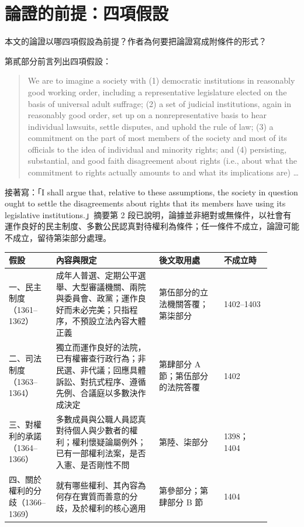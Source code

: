 \chapter{論證的前提：四項假設}


\begin{qaquestion}
本文的論證以哪四項假設為前提？作者為何要把論證寫成附條件的形式？
\end{qaquestion}

第貳部分前言列出四項假設：

\begin{quote}
We are to imagine a society with (1) democratic institutions in reasonably good working order, including a representative legislature elected on the basis of universal adult suffrage; (2) a set of judicial institutions, again in reasonably good order, set up on a nonrepresentative basis to hear individual lawsuits, settle disputes, and uphold the rule of law; (3) a commitment on the part of most members of the society and most of its officials to the idea of individual and minority rights; and (4) persisting, substantial, and good faith disagreement about rights (i.e., about what the commitment to rights actually amounts to and what its implications are) \ldots{}
\end{quote}

接著寫：「I shall argue that, relative to these assumptions, the society in question ought to settle the disagreements about rights that its members have using its legislative institutions.」摘要第 2 段已說明，論據並非絕對或無條件，以社會有運作良好的民主制度、多數公民認真對待權利為條件；任一條件不成立，論證可能不成立，留待第柒部分處理。

\begin{longtable}{@{}L{0.16\linewidth}L{0.35\linewidth}L{0.22\linewidth}L{0.16\linewidth}@{}}
\toprule
假設 & 內容與限定 & 後文取用處 & 不成立時 \\
\midrule
\endhead
一、民主制度（1361--1362） & 成年人普選、定期公平選舉、大型審議機關、兩院與委員會、政黨；運作良好而未必完美；只指程序，不預設立法內容大體正義 & 第伍部分的立法機關答覆；第柒部分 & 1402--1403 \\
二、司法制度（1363--1364） & 獨立而運作良好的法院，已有權審查行政行為；非民選、非代議；回應具體訴訟、對抗式程序、遵循先例、合議庭以多數決作成決定 & 第肆部分 A 節；第伍部分的法院答覆 & 1402 \\
三、對權利的承諾（1364--1366） & 多數成員與公職人員認真對待個人與少數者的權利；權利懷疑論屬例外；已有一部權利法案，是否入憲、是否剛性不問 & 第陸、柒部分 & 1398；1404 \\
四、關於權利的分歧（1366--1369） & 就有哪些權利、其內容為何存在實質而善意的分歧，及於權利的核心適用 & 第參部分；第肆部分 B 節 & 1404 \\
\bottomrule
\end{longtable}

